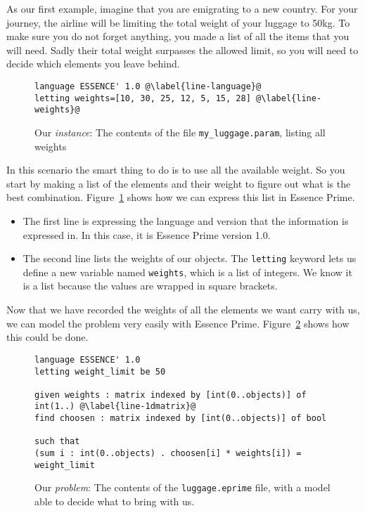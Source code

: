 As our first example, imagine that you are emigrating to a new country. For
your journey, the airline will be limiting the total weight of your luggage to
50kg.  To make sure you do not forget anything, you made a list of all the
items that you will need. Sadly their total weight surpasses the allowed limit,
so you will need to decide which elements you leave behind.

\begin{figure}
\begin{lstlisting}
language ESSENCE' 1.0 @\label{line-language}@
letting weights=[10, 30, 25, 12, 5, 15, 28] @\label{line-weights}@
\end{lstlisting}
    \caption{Our \emph{instance}: The contents of the file \texttt{my\_luggage.param}, listing all weights}
\label{fig-knapsack1param}
\end{figure}

In this scenario the smart thing to do is to use all the available weight. So
you start by making a list of the elements and their weight to figure out what
is the best combination. Figure~\ref{fig-knapsack1param} shows how we can
express this list in Essence Prime.

\begin{itemize}
    \item The first line is expressing the language and version that the
        information is expressed in. In this case, it is Essence Prime version
        1.0. 
    \item The second line lists the weights of our objects. The
        \texttt{letting} keyword lets us define a new variable named
        \texttt{weights}, which is a list of integers.  We know it is a list
        because the values are wrapped in square brackets.
\end{itemize}

Now that we have recorded the weights of all the elements we want carry with us,
we can model the problem very easily with Essence Prime. Figure~\ref{fig-knapsack1}
shows how this could be done.

\begin{figure}
\begin{lstlisting}
language ESSENCE' 1.0
letting weight_limit be 50

given weights : matrix indexed by [int(0..objects)] of int(1..) @\label{line-1dmatrix}@
find choosen : matrix indexed by [int(0..objects)] of bool

such that
(sum i : int(0..objects) . choosen[i] * weights[i]) = weight_limit
\end{lstlisting}
    \caption{Our \emph{problem}: The contents of the \texttt{luggage.eprime} file, with a model able to decide what to bring with us.}
\label{fig-knapsack1}
\end{figure}

